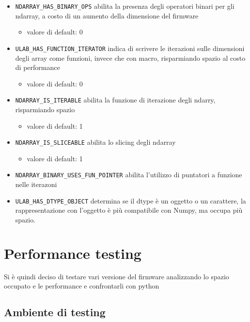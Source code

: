 \documentclass[12pt,a4paper]{report}
\begin{document}
\begin{itemize}
\item
  \texttt{NDARRAY\_HAS\_BINARY\_OPS} abilita la presenza degli operatori
  binari per gli ndarray, a costo di un aumento della dimensione del
  firmware

  \begin{itemize}
    \item
    valore di default: 0
  \end{itemize}
\item
  \texttt{ULAB\_HAS\_FUNCTION\_ITERATOR} indica di scrivere le
  iterazioni sulle dimensioni degli array come funzioni, invece che con
  macro, risparmiando spazio al costo di performance

  \begin{itemize}
    \item
    valore di default: 0
  \end{itemize}
\item
  \texttt{NDARRAY\_IS\_ITERABLE} abilita la funzione di iterazione degli
  ndarry, risparmiando spazio

  \begin{itemize}
    \item
    valore di default: 1
  \end{itemize}
\item
  \texttt{NDARRAY\_IS\_SLICEABLE} abilita lo slicing degli ndarray

  \begin{itemize}
    \item
    valore di default: 1
  \end{itemize}
\item
  \texttt{NDARRAY\_BINARY\_USES\_FUN\_POINTER} abilita
  l'utilizzo di puntatori a funzione nelle iterazoni
\item
  \texttt{ULAB\_HAS\_DTYPE\_OBJECT} determina se il dtype è un oggetto o
  un carattere, la rappresentazione con l'oggetto è più
  compatibile con Numpy, ma occupa più spazio.
\end{itemize}

\chapter{Performance testing}

Si è quindi deciso di testare vari versione del firmware analizzando lo
spazio occupato e le performance e confrontarli con python

\section{Ambiente di testing}
\end{document}
